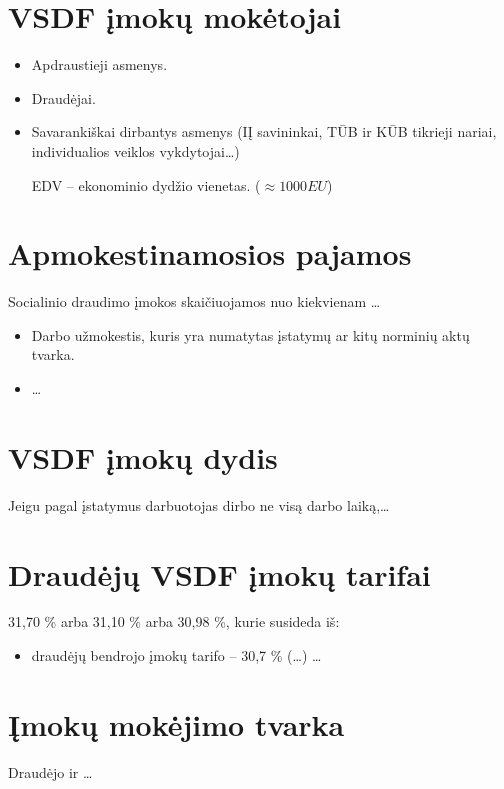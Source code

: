 \section{VSDF įmokų mokėtojai}

\begin{itemize}
  \item Apdraustieji asmenys.
  \item Draudėjai.
  \item Savarankiškai dirbantys asmenys (IĮ savininkai, TŪB ir KŪB
    tikrieji nariai, individualios veiklos vykdytojai…)

    EDV – ekonominio dydžio vienetas. ($\approx 1000 EU$)
\end{itemize}

\section{Apmokestinamosios pajamos}

Socialinio draudimo įmokos skaičiuojamos nuo kiekvienam …

\begin{itemize}
  \item Darbo užmokestis, kuris yra numatytas įstatymų ar kitų norminių
    aktų tvarka.
  \item …
\end{itemize}

\section{VSDF įmokų dydis}

Jeigu pagal įstatymus darbuotojas dirbo ne visą darbo laiką,…

\section{Draudėjų VSDF įmokų tarifai}

31,70 \% arba 31,10 \% arba  30,98 \%, kurie susideda iš:
\begin{itemize}
  \item draudėjų bendrojo įmokų tarifo – 30,7 \% (…)
    …
\end{itemize}

\section{Įmokų mokėjimo tvarka}

Draudėjo ir …

